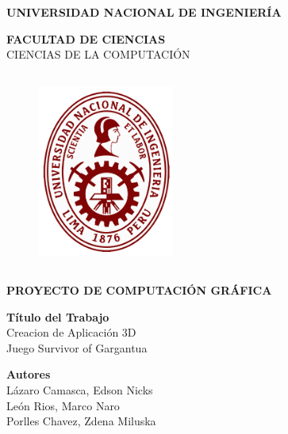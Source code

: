 \documentclass[a4paper]{article}
\begin{document}
\begin{titlepage}
\begin{center}
\vspace*{-0.4in}

{\fontsize{12}{30}\bf \selectfont UNIVERSIDAD NACIONAL DE INGENIERÍA\\}

{\fontsize{12}{40}\bf \selectfont FACULTAD DE CIENCIAS\\}
\vspace*{0.15in} CIENCIAS DE LA COMPUTACIÓN\\
\vspace*{0.2in}
\begin{figure}[htb]
\begin{center}
\includegraphics[width=4.5cm,height=6.5cm]{UNI.png}
\end{center}
\end{figure}
\begin{Large}
\textbf{PROYECTO DE COMPUTACIÓN GRÁFICA\\}
\end{Large}
\vspace*{0.2in}

\begin{large}
{\bf Título del Trabajo\\}
\vspace*{0.1in}
{\fontsize{12}{13}\selectfont 
Creacion de Aplicación 3D\\ Juego Survivor of Gargantua\\}
\end{large}
\vspace*{0.3in}

\begin{large}
{\bf Autores} 
\vspace*{0.1in}
\\L\'azaro Camasca, Edson Nicks
\\León Rios, Marco Naro
\\Porlles Chavez, Zdena Miluska


\end{large}
\end{center}
\end{titlepage}
\end{document}
